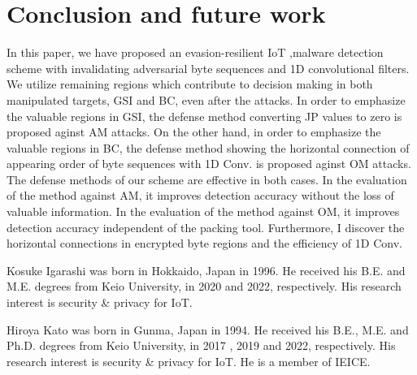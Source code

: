 \documentclass{ieeeaccess}
\begin{document}
\section{Conclusion and future work} \label{sec:conclusion}
In this paper, we have proposed an evasion-resilient IoT ,malware detection scheme with invalidating adversarial byte sequences and 1D convolutional filters. 
We utilize remaining regions which contribute to decision making in both manipulated targets, GSI and BC, even after the attacks.
In order to emphasize the valuable regions in GSI, the defense method converting JP values to zero is proposed aginst AM attacks.
On the other hand, in order to emphasize the valuable regions in BC, the defense method showing the horizontal connection of appearing order of byte sequences with 1D Conv. is proposed aginst OM attacks.
The defense methods of our scheme are effective in both cases.
In the evaluation of the method against AM, it improves detection accuracy without the loss of valuable information.
In the evaluation of the method against OM, it improves detection accuracy independent of the packing tool.
Furthermore, I discover the horizontal connections in encrypted byte regions and the efficiency of 1D Conv.



\begin{IEEEbiography}{Kosuke Igarashi} was born in Hokkaido, Japan in 1996. He received his B.E. and M.E. degrees from Keio University, in 2020 and 2022, respectively. His research interest is security \& privacy for IoT.
\end{IEEEbiography}

\begin{IEEEbiography}{Hiroya Kato} was born in Gunma, Japan in 1994. He received his B.E., M.E. and Ph.D. degrees from Keio University, in 2017 , 2019 and 2022, respectively. His research interest is security \& privacy for IoT. He is a member of IEICE.
\end{IEEEbiography} 
\end{document}
